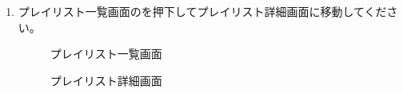 \begin{enumerate}
            \newpage
            \item プレイリスト一覧画面のを押下してプレイリスト詳細画面に移動してください。
                \begin{figure}[htbp]
                    \begin{minipage}[b]{0.45\linewidth}
                        \centering
                        \caption{プレイリスト一覧画面}
                        \label{img:playlist2}
                    \end{minipage}
                    \begin{minipage}[b]{0.45\linewidth}
                        \centering
                        \caption{プレイリスト詳細画面}
                        \label{img:playlist3}
                    \end{minipage}
                \end{figure}


\end{enumerate}
